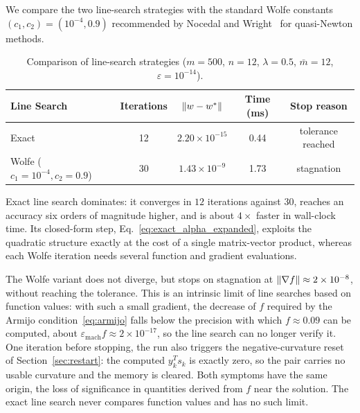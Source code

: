 \noindent We compare the two line-search strategies with the standard Wolfe
constants $(c_1, c_2) = (10^{-4}, 0.9)$ recommended by Nocedal and
Wright~\cite[Sec.~3.1]{nocedal2006numerical} for quasi-Newton methods.

\begin{table}[H]
\centering
\caption{Comparison of line-search strategies
  ($m = 500$, $n = 12$, $\lambda = 0.5$, $\bar{m} = 12$,
  $\varepsilon = 10^{-14}$).}
\label{tab:ls_comparison}
\small
\setlength{\tabcolsep}{10pt}
\begin{tabular}{lcccc}
    \toprule
    \textbf{Line Search} & \textbf{Iterations} & $\left\|w - w^*\right\|$
      & \textbf{Time (ms)} & \textbf{Stop reason} \\
    \midrule
    Exact   & 12  & $2.20 \times 10^{-15}$ & 0.44 & tolerance reached \\
    Wolfe ($c_1=10^{-4}, c_2=0.9$) & 30 & $1.43 \times 10^{-9}$ & 1.73 & stagnation \\
    \bottomrule
\end{tabular}
\end{table}

\noindent Exact line search dominates: it converges in $12$ iterations against
$30$, reaches an accuracy six orders of magnitude higher, and is about
$4\times$ faster in wall-clock time. Its closed-form step,
Eq.~\eqref{eq:exact_alpha_expanded}, exploits the quadratic structure exactly
at the cost of a single matrix-vector product, whereas each Wolfe iteration
needs several function and gradient evaluations.

\noindent The Wolfe variant does not diverge, but stops on stagnation at
$\left\|\nabla f\right\| \approx 2 \times 10^{-8}$, without reaching the tolerance.
This is an intrinsic limit of line searches based on function values: with
such a small gradient, the decrease of $f$ required by the Armijo
condition~\eqref{eq:armijo} falls below the precision with which
$f \approx 0.09$ can be computed, about
$\varepsilon_{\mathrm{mach}} f \approx 2 \times 10^{-17}$, so the line search
can no longer verify it. One iteration before stopping, the run also triggers
the negative-curvature reset of Section~\ref{sec:restart}: the computed
$y_k^T s_k$ is exactly zero, so the pair carries no usable curvature and the
memory is cleared. Both symptoms have the same origin, the loss of
significance in quantities derived from $f$ near the solution. The exact line
search never compares function values and has no such limit.


